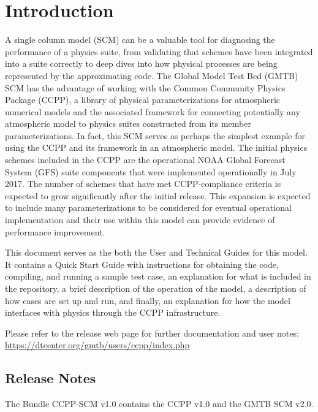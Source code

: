 \chapter{Introduction}
\label{chapter: introduction}

A single column model (SCM) can be a valuable tool for diagnosing the performance of a physics suite, from validating that schemes have been integrated into a suite correctly to deep dives into how physical processes are being represented by the approximating code. The Global Model Test Bed (GMTB) SCM has the advantage of working with the Common Community Physics Package (CCPP), a library of physical parameterizations for atmospheric numerical models and the associated framework for connecting potentially any atmospheric model to physics suites constructed from its member parameterizations. In fact, this SCM serves as perhaps the simplest example for using the CCPP and its framework in an atmospheric model. The initial physics schemes included in the CCPP are the operational NOAA Global Forecast System (GFS) suite components that were implemented operationally in July 2017. The number of schemes that have met CCPP-compliance criteria is expected to grow significantly after the initial release. This expansion is expected to include many parameterizations to be considered for eventual operational implementation and their use within this model can provide evidence of performance improvement.

This document serves as the both the User and Technical Guides for this model. It contains a Quick Start Guide with instructions for obtaining the code, compiling, and running a sample test case, an explanation for what is included in the repository, a brief description of the operation of the model, a description of how cases are set up and run, and finally, an explanation for how the model interfaces with physics through the CCPP infrastructure.

Please refer to the release web page for further documentation and user notes:\\ \url{https://dtcenter.org/gmtb/users/ccpp/index.php}

\section{Release Notes}

The Bundle CCPP-SCM v1.0 contains the CCPP v1.0 and the GMTB SCM v2.0.

